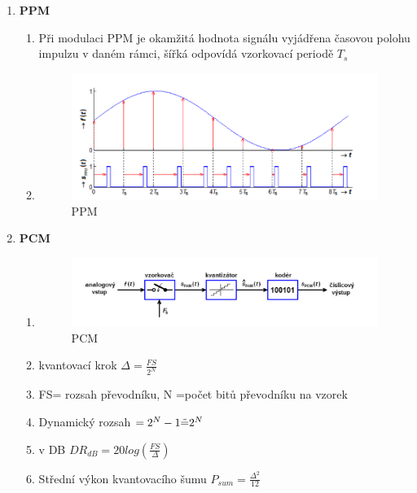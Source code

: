 \begin{enumerate}
\begin{enumerate}
\begin{figure}[h!]
        \end{figure}
    \end{enumerate}
    \item \textbf{PPM}
    \begin{enumerate}
        \item Při modulaci PPM je okamžitá hodnota signálu vyjádřena časovou polohu impulzu v daném rámci, šířká odpovídá vzorkovací periodě $T_s$
        \item \begin{figure}[h!]
            \centering
            \includegraphics[scale=0.5]{images/PPM.png}
            \caption{PPM}
            \label{fig:enter-label}
        \end{figure}
    \end{enumerate}
    \clearpage
    \item \textbf{PCM}
    \begin{enumerate}
        \item \begin{figure}[h!]
        \centering
        \includegraphics[scale=0.5]{images/pcmdiag.png}
        \caption{PCM}
        \label{fig:enter-label}
        \end{figure}
        \item kvantovací krok $\Delta=\frac{FS}{2^N}$
        \item  FS= rozsah převodníku, N =počet bitů převodníku na vzorek
        \item Dynamický rozsah  $=2^N-1\Tilde{=}2^N$
        \item v DB $DR_{dB}=20log(\frac{FS}{\Delta})$
        \item Střední výkon kvantovacího šumu $P_{sum}=\frac{\Delta^2}{12}$

\end{enumerate}
\end{enumerate}
